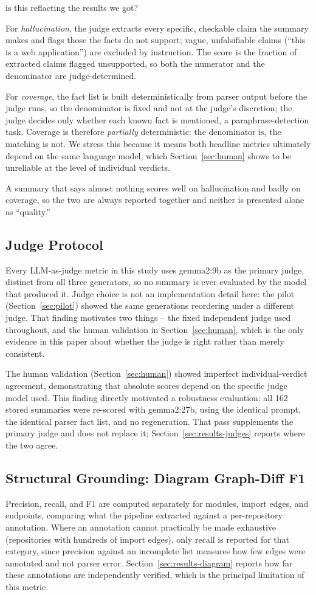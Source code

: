 is this reflacting the results we got?\documentclass[conference]{IEEEtran}
\begin{document}
For \emph{hallucination}, the judge extracts every specific, checkable claim the summary makes
and flags those the facts do not support; vague, unfalsifiable claims (``this is a web
application'') are excluded by instruction. The score is the fraction of extracted claims
flagged unsupported, so both the numerator and the denominator are judge-determined.

For \emph{coverage}, the fact list is built deterministically from parser output before the
judge runs, so the denominator is fixed and not at the judge's discretion; the judge decides
only whether each known fact is mentioned, a paraphrase-detection task. Coverage is therefore
\emph{partially} deterministic: the denominator is, the matching is not. We stress this because
it means both headline metrics ultimately depend on the same language model, which
Section~\ref{sec:human} shows to be unreliable at the level of individual verdicts.

A summary that says almost nothing scores well on hallucination and badly on coverage, so the
two are always reported together and neither is presented alone as ``quality.''

\subsection{Judge Protocol}
\label{sec:methodology-judges}
Every LLM-as-judge metric in this study uses gemma2:9b as the primary judge, distinct from all three
generators, so no summary is ever evaluated by the model that produced it. Judge choice is not
an implementation detail here: the pilot (Section~\ref{sec:pilot}) showed the same generations
reordering under a different judge. That finding motivates two things -- the fixed independent
judge used throughout, and the human validation in Section~\ref{sec:human}, which is the only
evidence in this paper about whether the judge is right rather than merely consistent.

The human validation (Section~\ref{sec:human}) showed imperfect individual-verdict agreement, demonstrating that absolute scores depend on the specific judge model used. This finding directly motivated a robustness evaluation: all 162 stored summaries were re-scored with gemma2:27b, using the identical prompt, the identical parser fact list, and no regeneration. That pass supplements the primary judge and does not replace it; Section~\ref{sec:results-judges} reports where the two agree.

\subsection{Structural Grounding: Diagram Graph-Diff F1}
Precision, recall, and F1 are computed separately for modules, import edges, and endpoints,
comparing what the pipeline extracted against a per-repository annotation. Where an annotation
cannot practically be made exhaustive (repositories with hundreds of import edges), only recall
is reported for that category, since precision against an incomplete list measures how few edges
were annotated and not parser error. Section~\ref{sec:results-diagram} reports how far these
annotations are independently verified, which is the principal limitation of this metric.
\end{document}
